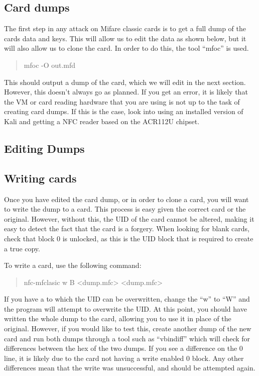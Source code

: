 \documentclass[a4paper,11pt]{report}
\begin{document}
		\subsection{Card dumps}
			The first step in any attack on Mifare classic cards is to get a full dump of the cards data and keys. 
			This will allow us to edit the data as shown below, but it will also allow us to clone the card. 
			In order to do this, the tool ``mfoc'' is used. 
			\begin{quote}
				mfoc -O out.mfd
			\end{quote}
			This should output a dump of the card, which we will edit in the next section. 
			However, this doesn't always go as planned. 
			If you get an error, it is likely that the VM or card reading hardware that you are using is not up to the task of creating card dumps. 
			If this is the case, look into using an installed version of Kali and getting a NFC reader based on the ACR112U chipset. 
		\subsection{Editing Dumps}
		\subsection{Writing cards}
			Once you have edited the card dump, or in order to clone a card, you will want to write the dump to a card. 
			This process is easy given the correct card or the original. 
			However, without this, the UID of the card cannot be altered, making it easy to detect the fact that the card is a forgery. 
			When looking for blank cards, check that block 0 is unlocked, as this is the UID block that is required to create a true copy. 

			To write a card, use the following command:
			\begin{quote}
				nfc-mfclasic w B <dump.mfc> <dump.mfc> 
			\end{quote}
			If you have a to which the UID can be overwritten, change the ``w'' to ``W'' and the program will attempt to overwrite the UID. 
			At this point, you should have written the whole dump to the card, allowing you to use it in place of the original. 
			However, if you would like to test this, create another dump of the new card and run both dumps through a tool such as ``vbindiff'' which will check for differences between the hex of the two dumps. 
			If you see a difference on the 0 line, it is likely due to the card not having a write enabled 0 block. 
			Any other differences mean that the write was unsuccessful, and should be attempted again. 
\end{document}
